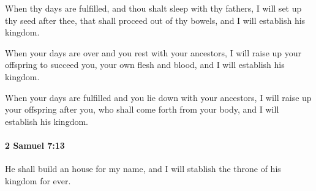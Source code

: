 			\begin{versebox}
					\item[BHS] 
					\item[ASV] When thy days are fulfilled, and thou shalt sleep with thy fathers, I will set up thy seed after thee, that shall proceed out of thy bowels, and I will establish his kingdom.
					\item[NIV] When your days are over and you rest with your ancestors, I will raise up your offspring to succeed you, your own flesh and blood, and I will establish his kingdom.
					\item[NRSV] When your days are fulfilled and you lie down with your ancestors, I will raise up your offspring after you, who shall come forth from your body, and I will establish his kingdom.
			\end{versebox}

		\paragraph{2 Samuel 7:13} %
			\label{2SAMUEL-7-13}

			He shall build an house for my name, and I will stablish the throne of his kingdom for ever.

